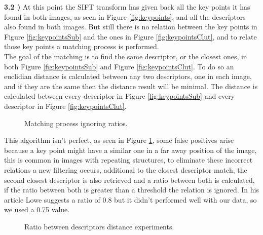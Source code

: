 \documentclass[12pt,a4paper]{article}
\begin{document}
\textbf{3.2 )} At this point the SIFT transform has given back all the key points it has found in both images, as seen in Figure \ref{fig:keypoints}, and all the descriptors also found in both images. But still there is no relation between the key points in Figure \ref{fig:keypointsSub} and the ones in Figure \ref{fig:keypointsClut}, and to relate those key points a matching process is performed. \\

The goal of the matching is to find the same descriptor, or the closest ones, in both Figure \ref{fig:keypointsSub} and Figure \ref{fig:keypointsClut}. To do so an euclidian distance is calculated between any two descriptors, one in each image, and if they are the same then the distance result will be minimal. The distance is calculated between every descriptor in Figure \ref{fig:keypointsSub} and every descriptor in Figure \ref{fig:keypointsClut}. \\

\begin{figure}[!h]
	\centering
		{
			\setlength{\fboxsep}{1pt}
			\setlength{\fboxrule}{1pt}
		}
	\caption{Matching process ignoring ratios.}
	\label{fig:noRatio}
\end{figure}
	
	This algorithm isn't perfect, as seen in Figure \ref{fig:noRatio}, some false positives arise because a key point might have a similar one in a far away position of the image, this is common in images with repeating structures, to eliminate these incorrect relations a new filtering occurs, additional to the closest descriptor match, the second closest descriptor is also retrieved and a ratio between both is calculated, if the ratio between both is greater than a threshold the relation is ignored. In his article Lowe suggests a ratio of 0.8 but it didn't performed well with our data, so we used a 0.75 value. \\

\begin{figure}[!h]
	\centering
	\quad
	\caption{Ratio between descriptors distance experiments.}
	\label{fig:matchRatio}
\end{figure}
\end{document}
